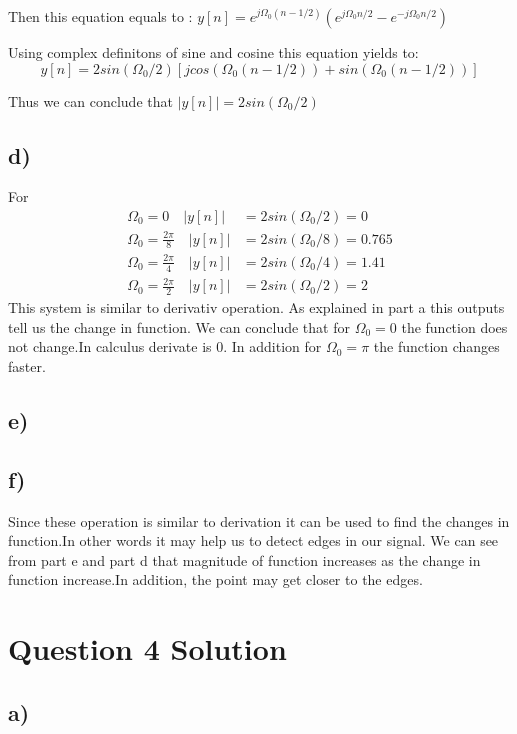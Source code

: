 \documentclass[letterpaper,12pt]{article}
\begin{document}
 Then this equation equals to : \(y[n]= e^{j \Omega_0 (n-1/2)}(e^{j \Omega_0 n/2}-e^{-j \Omega_0 n/2})\)

 Using complex definitons of sine and cosine this equation yields to: \[y[n]= 2sin(\Omega_0 /2)[jcos(\Omega_0 (n-1/2))+sin(\Omega_0 (n-1/2))]\]

 Thus we can conclude that $|y[n]|= 2sin(\Omega_0 /2)$

\subsection{d)}

For \begin{equation}
    \begin{split}
        \Omega_0 = 0 \quad |y[n]|&= 2sin(\Omega_0 /2)=0\\
 \Omega_0 = \frac{2\pi}{8} \quad |y[n]|&= 2sin(\Omega_0 /8)=0.765\\
 \Omega_0 = \frac{2\pi}{4} \quad |y[n]|&= 2sin(\Omega_0 /4)=1.41\\
 \Omega_0 = \frac{2\pi}{2} \quad |y[n]|&= 2sin(\Omega_0 /2)=2
    \end{split}
\end{equation}
This system is similar to derivativ operation. As explained in part a this outputs tell us the change in function. We can conclude that for \( \Omega_0 = 0\) the function does not change.In calculus derivate is 0. In addition for  \( \Omega_0 = \pi \) the function changes faster.
\subsection{e)}

\subsection{f)}
Since these operation is similar to derivation it can be used to find the changes in function.In other words it may help us to detect edges in our signal. We can see from part e and part d that magnitude of function increases as the change in function increase.In addition, the point may get closer to the edges.
\section{Question 4 Solution}
\subsection{a)}
\end{document}
